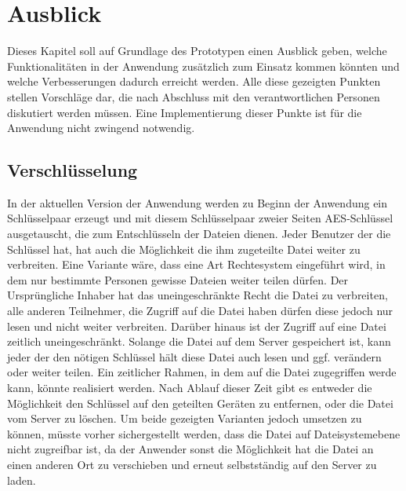 \documentclass[10pt, a4paper,headsepline]{scrreprt}
\begin{document}
\section{Ausblick}
Dieses Kapitel soll auf Grundlage des Prototypen einen Ausblick geben, welche Funktionalitäten in der Anwendung zusätzlich zum Einsatz kommen könnten und welche Verbesserungen dadurch erreicht werden. Alle diese gezeigten Punkten stellen Vorschläge dar, die nach Abschluss mit den verantwortlichen Personen diskutiert werden müssen. Eine Implementierung dieser Punkte ist für die Anwendung nicht zwingend notwendig.


\subsection{Verschlüsselung}
In der aktuellen Version der Anwendung werden zu Beginn der Anwendung ein Schlüsselpaar erzeugt und mit diesem Schlüsselpaar zweier Seiten AES-Schlüssel ausgetauscht, die zum Entschlüsseln der Dateien dienen. Jeder Benutzer der die Schlüssel hat, hat auch die Möglichkeit die ihm zugeteilte Datei weiter zu verbreiten. Eine Variante wäre, dass eine Art Rechtesystem eingeführt wird, in dem nur bestimmte Personen gewisse Dateien weiter teilen dürfen. Der Ursprüngliche Inhaber hat das uneingeschränkte Recht die Datei zu verbreiten, alle anderen Teilnehmer, die Zugriff auf die Datei haben dürfen diese jedoch nur lesen und nicht weiter verbreiten. Darüber hinaus ist der Zugriff auf eine Datei zeitlich uneingeschränkt. Solange die Datei auf dem Server gespeichert ist, kann jeder der den nötigen Schlüssel hält diese Datei auch lesen und ggf. verändern oder weiter teilen. Ein zeitlicher Rahmen, in dem auf die Datei zugegriffen werde kann, könnte realisiert werden. Nach Ablauf dieser Zeit gibt es entweder die Möglichkeit den Schlüssel auf den geteilten Geräten zu entfernen, oder die Datei vom Server zu löschen. Um beide gezeigten Varianten jedoch umsetzen zu können, müsste vorher sichergestellt werden, dass die Datei auf Dateisystemebene nicht zugreifbar ist, da der Anwender sonst die Möglichkeit hat die Datei an einen anderen Ort zu verschieben und erneut selbstständig auf den Server zu laden.
\end{document}
